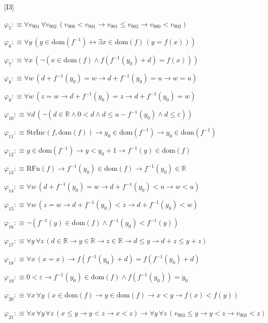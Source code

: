 \begin{fullproof}{[I3]}
\begin{abbrevlist}
\item $\varphi_{5} :\equiv \forall v_{901}\,\forall v_{902}\,(v_{900} < v_{901} \to v_{901} \leq v_{902} \to v_{900} < v_{902})$
\item $\varphi_{6} :\equiv \forall y\,(y \in \mathrm{dom}(f^{-1}) \leftrightarrow \exists x \in \mathrm{dom}(f)\,(y = f(x)))$
\item $\varphi_{7} :\equiv \forall x\,(\neg (x \in \mathrm{dom}(f) \land f(f^{-1}(y_{0}) + d) = f(x)))$
\item $\varphi_{8} :\equiv \forall w\,(d + f^{-1}(y_{0}) = w \to d + f^{-1}(y_{0}) = u \to w = u)$
\item $\varphi_{9} :\equiv \forall w\,(z = w \to d + f^{-1}(y_{0}) = z \to d + f^{-1}(y_{0}) = w)$
\item $\varphi_{10} :\equiv \forall d\,(\neg (d \in \mathbb{R} \land 0 < d \land d \leq u - f^{-1}(y_{0}) \land d \leq \varepsilon))$
\item $\varphi_{11} :\equiv \mathrm{StrInc}(f,\mathrm{dom}(f)) \to y_{0} \in \mathrm{dom}(f^{-1}) \to y_{0} \in \mathrm{dom}(f^{-1})$
\item $\varphi_{12} :\equiv y \in \mathrm{dom}(f^{-1}) \to y < y_{0} + 1 \to f^{-1}(y) \in \mathrm{dom}(f)$
\item $\varphi_{13} :\equiv \mathrm{RFn}(f) \to f^{-1}(y_{0}) \in \mathrm{dom}(f) \to f^{-1}(y_{0}) \in \mathbb{R}$
\item $\varphi_{14} :\equiv \forall w\,(d + f^{-1}(y_{0}) = w \to d + f^{-1}(y_{0}) < u \to w < u)$
\item $\varphi_{15} :\equiv \forall w\,(z = w \to d + f^{-1}(y_{0}) < z \to d + f^{-1}(y_{0}) < w)$
\item $\varphi_{16} :\equiv \neg (f^{-1}(y) \in \mathrm{dom}(f) \land f^{-1}(y_{0}) < f^{-1}(y))$
\item $\varphi_{17} :\equiv \forall y\,\forall z\,(d \in \mathbb{R} \to y \in \mathbb{R} \to z \in \mathbb{R} \to d \leq y \to d + z \leq y + z)$
\item $\varphi_{18} :\equiv \forall x\,(x = x) \to f(f^{-1}(y_{0}) + d) = f(f^{-1}(y_{0}) + d)$
\item $\varphi_{19} :\equiv 0 < \varepsilon \to f^{-1}(y_{0}) \in \mathrm{dom}(f) \land f(f^{-1}(y_{0})) = y_{0}$
\item $\varphi_{20} :\equiv \forall x\,\forall y\,(x \in \mathrm{dom}(f) \to y \in \mathrm{dom}(f) \to x < y \to f(x) < f(y))$
\item $\varphi_{21} :\equiv \forall x\,\forall y\,\forall z\,(x \leq y \to y < z \to x < z) \to \forall y\,\forall z\,(v_{903} \leq y \to y < z \to v_{903} < z)$

\end{abbrevlist}
\end{fullproof}
